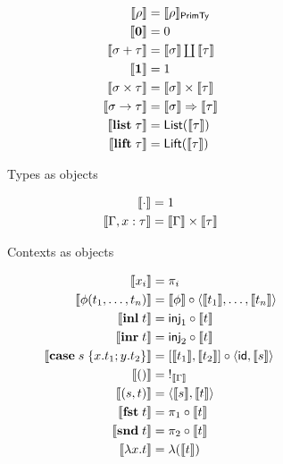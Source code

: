 \begin{figure}
\begin{subfigure}[t]{0.47\linewidth}
  \begin{align*}
  \small
  \llbracket \rho \rrbracket &= \llbracket \rho \rrbracket_{\mathsf{PrimTy}}
  \\
  \llbracket \mathbf{0} \rrbracket &= 0
  \\
  \llbracket \sigma + \tau \rrbracket &= \textstyle {\llbracket \sigma \rrbracket} \coprod {\llbracket \tau \rrbracket}
  \\
  \llbracket \mathbf{1} \rrbracket &= 1
  \\
  \llbracket \sigma \times \tau \rrbracket &= \llbracket \sigma \rrbracket \times \llbracket \tau \rrbracket
  \\
  \llbracket \sigma \to \tau \rrbracket &= \llbracket \sigma \rrbracket \Rightarrow \llbracket \tau \rrbracket
  \\
  \llbracket \mathbf{list}\;\tau \rrbracket &= \mathsf{List}(\llbracket \tau \rrbracket)
  \\
  \llbracket \mathbf{lift}\;\tau \rrbracket &= \mathsf{Lift}(\llbracket \tau \rrbracket)
  \end{align*}
  \caption{Types as objects}
  \label{fig:semantics:types}
\end{subfigure}%
\begin{subfigure}[t]{0.47\linewidth}
  \begin{align*}
  \small
  \llbracket \cdot \rrbracket &= 1
  \\
  \llbracket \Gamma, x: \tau \rrbracket &= \llbracket \Gamma \rrbracket \times \llbracket \tau \rrbracket
  \end{align*}
  \caption{Contexts as objects}
  \label{fig:semantics:contexts}
\end{subfigure}
\begin{subfigure}{\linewidth}
  \begin{align*}
  \small
  \sem{x_i} &= \pi_i
  \\
  \sem{\phi(t_1, \ldots, t_n)}
  &=
  \sem{\phi} \comp \prodM{\sem{t_1}}{\ldots, \sem{t_n}}
  \\
  \sem{\tmInl{t}} &= \mathsf{inj}_1 \comp \sem{t}
  \\
  \sem{\tmInr{t}} &= \mathsf{inj}_2 \comp \sem{t}
  \\
  \sem{\tmCase{s}{x}{t_1}{y}{t_2}} &= \coprodM{\sem{t_1}}{\sem{t_2}} \comp \prodM{\id}{\sem{s}}
  \\
  \sem{\tmUnit} &=\;!_{\sem{\Gamma}}
  \\
  \sem{\tmPair{s}{t}} &= \prodM{\sem{s}}{\sem{t}}
  \\
  \sem{\tmFst{t}} &= \pi_1 \comp \sem{t}
  \\
  \sem{\tmSnd{t}} &= \pi_2 \comp \sem{t}
  \\
  \sem{\tmFun{x}{t}} &= \lambda(\sem{t})
  \\

\end{align*}
\end{subfigure}
\end{figure}
